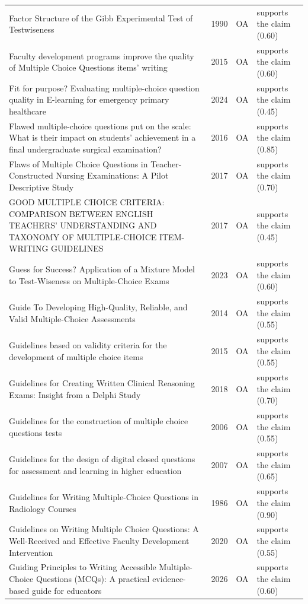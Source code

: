 \begin{longtable}{@{}%
  >{\raggedright\arraybackslash}p{}c%
  >{\raggedright\arraybackslash}p{}%
  >{\raggedright\arraybackslash}p{}@{}}
Factor Structure of the Gibb Experimental Test of Testwiseness & 1990 & OA & supports the claim (0.60) \\
Faculty development programs improve the quality of Multiple Choice Questions items' writing & 2015 & OA & supports the claim (0.60) \\
Fit for purpose? Evaluating multiple-choice question quality in E-learning for emergency primary healthcare & 2024 & OA & supports the claim (0.45) \\
Flawed multiple-choice questions put on the scale: What is their impact on students' achievement in a final undergraduate surgical examination? & 2016 & OA & supports the claim (0.85) \\
Flaws of Multiple Choice Questions in Teacher-Constructed Nursing Examinations: A Pilot Descriptive Study & 2017 & OA & supports the claim (0.70) \\
GOOD MULTIPLE CHOICE CRITERIA: COMPARISON BETWEEN ENGLISH TEACHERS' UNDERSTANDING AND TAXONOMY OF MULTIPLE-CHOICE ITEM-WRITING GUIDELINES & 2017 & OA & supports the claim (0.45) \\
Guess for Success? Application of a Mixture Model to Test-Wiseness on Multiple-Choice Exams & 2023 & OA & supports the claim (0.60) \\
Guide To Developing High-Quality, Reliable, and Valid Multiple-Choice Assessments & 2014 & OA & supports the claim (0.55) \\
Guidelines based on validity criteria for the development of multiple choice items & 2015 & OA & supports the claim (0.55) \\
Guidelines for Creating Written Clinical Reasoning Exams: Insight from a Delphi Study & 2018 & OA & supports the claim (0.70) \\
Guidelines for the construction of multiple choice questions tests & 2006 & OA & supports the claim (0.55) \\
Guidelines for the design of digital closed questions for assessment and learning in higher education & 2007 & OA & supports the claim (0.65) \\
Guidelines for Writing Multiple-Choice Questions in Radiology Courses & 1986 & OA & supports the claim (0.90) \\
Guidelines on Writing Multiple Choice Questions: A Well-Received and Effective Faculty Development Intervention & 2020 & OA & supports the claim (0.55) \\
Guiding Principles to Writing Accessible Multiple-Choice Questions (MCQs): A practical evidence-based guide for educators & 2026 & OA & supports the claim (0.60) \\

\end{longtable}
